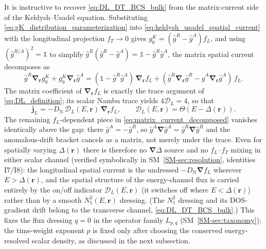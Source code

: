 \documentclass[
  aps,
  prb,
  preprint,
  superscriptaddress,
  longbibliography,
  nofootinbib
]{revtex4-2}
\newcommand{\br}{\mathbf{r}}
\newcommand{\bnabla}{\boldsymbol{\nabla}}
\newcommand{\DOS}{N_1}
\newcommand{\DN}{D_{\mathrm{N}}}
\newcommand{\fL}{f_L}
\newcommand{\fT}{f_T}
\providecommand{\openone}{}\renewcommand{\openone}{\mathds{1}}
\begin{document}
It is instructive to recover \cref{eq:DL_DT_BCS_bulk} from the
matrix-current side of the Keldysh--Usadel equation. Substituting
\cref{eq:gK_distribution_parameterization} into
\cref{eq:keldysh_usadel_spatial_current} with the longitudinal
projection \(\fT\to0\) gives \(g_0^K=(\hat{g}^R-\hat{g}^A)\fL\), and using
\((\hat{g}^{R/A})^2=\openone\) to simplify
\(\hat{g}^R(\hat{g}^R-\hat{g}^A)=\openone-\hat{g}^R\hat{g}^A\), the matrix
spatial current decomposes as
\begin{equation}
  \hat{g}^R\bnabla_{\br}g_0^K+g_0^K\bnabla_{\br}\hat{g}^A
  =
  (\openone-\hat{g}^R\hat{g}^A)\,\bnabla_{\br}\fL
  +
  (\hat{g}^R\bnabla_{\br}\hat{g}^R-\hat{g}^A\bnabla_{\br}\hat{g}^A)\,\fL .
  \label{eq:matrix_current_decomposed}
\end{equation}
The matrix coefficient of \(\bnabla_{\br}\fL\) is exactly the trace argument of
\cref{eq:DL_definition}; its scalar Nambu trace yields
\(4\mathcal{D}_L=4\), so that
\begin{equation}
  \mathbf{j}_L
  =
  -\DN\,\mathcal{D}_L(E,\br)\,\bnabla_{\br}\fL,
  \qquad
  \mathcal{D}_L(E,\br)=\Theta\!\left(E-\Delta(\br)\right) .
  \label{eq:longitudinal_usadel_current}
\end{equation}
The remaining \(\fL\)-dependent piece in
\cref{eq:matrix_current_decomposed} vanishes identically above the gap:
there \(\hat{g}^A=-\hat{g}^R\), so
\(\hat{g}^A\bnabla\hat{g}^A=\hat{g}^R\bnabla\hat{g}^R\) and the
anomalous-drift bracket cancels as a matrix, not merely under the trace.
Even for spatially varying \(\Delta(\br)\) there is therefore no
\(\bnabla\Delta\) source and no \(\fL\)--\(\fT\) mixing in either scalar
channel (verified symbolically in SM~\cref{SM-sec:resolution},
identities I7/I8): the longitudinal spatial current is
the undressed \(-\DN\bnabla\fL\) wherever \(E>\Delta(\br)\), and the
spatial structure of the energy-channel flux is carried entirely by the
on/off indicator \(\mathcal{D}_L(E,\br)\) (it switches off where
\(E<\Delta(\br)\)) rather than by a smooth \(\DOS^2(E,\br)\) dressing.
(The \(\DOS^2\) dressing and its DOS-gradient drift belong to the
transverse channel, \cref{eq:DL_DT_BCS_bulk}.) This fixes the flux
dressing \(q=0\) in the operator family \(L_{p,q}\)
(SM~\cref{SM-sec:taxonomy}); the
time-weight exponent \(p\) is fixed only after choosing the conserved
energy-resolved scalar density, as discussed in the next subsection.
\end{document}
